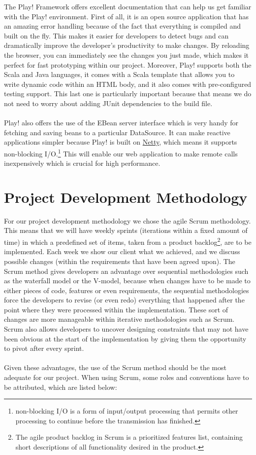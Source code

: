  
The Play! Framework offers excellent documentation\cite{playDoc} that can help us get familiar with the Play! environment. First of all, it is an open source application that has an amazing error handling because of the fact that everything is compiled and built on the fly. This makes it easier for developers to detect bugs and can dramatically improve the developer's productivity to make changes. By reloading the browser, you can immediately see the changes you just made, which makes it perfect for fast prototyping within our project. Moreover, Play! supports both the Scala and Java languages, it comes with a Scala template that allows you to write dynamic code within an HTML body, and it also comes with pre-configured testing support. This last one is particularly important because that means we do not need to worry about adding JUnit dependencies to the build file. \\\\
Play! also offers the use of the EBean server interface which is very handy for fetching and saving beans to a particular DataSource. It can make reactive applications simpler because Play! is built on \href{http://netty.io/}{Netty}, which means it supports non-blocking I/O.\footnote{ non-blocking I/O is a form of input/output processing that permits other processing to continue before the transmission has finished.} This will enable our web application to make remote calls inexpensively which is crucial for high performance.

\section{Project Development Methodology} %

For our project development methodology we chose the agile Scrum methodology. This means that we will have weekly sprints (iterations within a fixed amount of time) in which a predefined set of items, taken from a product backlog\footnote{The agile product backlog in Scrum is a prioritized features list, containing short descriptions of all functionality desired in the product.\cite{backlog} }, are to be implemented. Each week we show our client what we achieved, and we discuss possible changes (within the requirements that have been agreed upon). The Scrum method gives developers an advantage over sequential methodologies such as the waterfall model or the V-model, because when changes have to be made to either pieces of code, features or even requirements, the sequential methodologies force the developers to revise (or even redo) everything that happened after the point where they were processed within the implementation. These sort of changes are more manageable within iterative methodologies such as Scrum. Scrum also allows developers to uncover designing constraints that may not have been obvious at the start of the implementation by giving them the opportunity to pivot after every sprint. \\\\
Given these advantages, the use of the Scrum method should be the most adequate for our project. When using Scrum, some roles and conventions have to be attributed, which are listed below:

